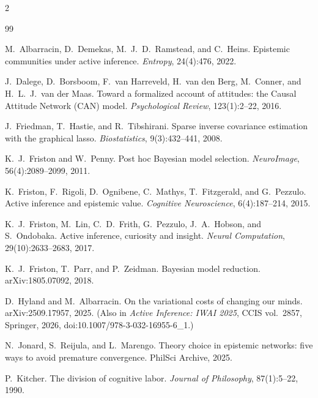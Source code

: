 \documentclass[11pt]{article}
\begin{document}
\setlength{\bibsep}{1.2pt}
\begin{multicols}{2}\raggedright
\begin{thebibliography}{99}\footnotesize

M.~Albarracin, D.~Demekas, M.~J.~D.~Ramstead, and C.~Heins.
Epistemic communities under active inference. \emph{Entropy}, 24(4):476, 2022.

J.~Dalege, D.~Borsboom, F.~van Harreveld, H.~van den Berg, M.~Conner, and H.~L.~J.~van der Maas.
Toward a formalized account of attitudes: the Causal Attitude Network (CAN) model.
\emph{Psychological Review}, 123(1):2--22, 2016.

J.~Friedman, T.~Hastie, and R.~Tibshirani.
Sparse inverse covariance estimation with the graphical lasso.
\emph{Biostatistics}, 9(3):432--441, 2008.

K.~J.~Friston and W.~Penny.
Post hoc Bayesian model selection. \emph{NeuroImage}, 56(4):2089--2099, 2011.

K.~Friston, F.~Rigoli, D.~Ognibene, C.~Mathys, T.~Fitzgerald, and G.~Pezzulo.
Active inference and epistemic value. \emph{Cognitive Neuroscience}, 6(4):187--214, 2015.

K.~J.~Friston, M.~Lin, C.~D.~Frith, G.~Pezzulo, J.~A.~Hobson, and S.~Ondobaka.
Active inference, curiosity and insight. \emph{Neural Computation}, 29(10):2633--2683, 2017.

K.~J.~Friston, T.~Parr, and P.~Zeidman.
Bayesian model reduction. arXiv:1805.07092, 2018.

D.~Hyland and M.~Albarracin.
On the variational costs of changing our minds. arXiv:2509.17957, 2025.
(Also in \emph{Active Inference: IWAI 2025}, CCIS vol.~2857, Springer, 2026,
doi:10.1007/978-3-032-16955-6\_1.)

N.~Jonard, S.~Reijula, and L.~Marengo.
Theory choice in epistemic networks: five ways to avoid premature convergence. PhilSci Archive, 2025.

P.~Kitcher.
The division of cognitive labor. \emph{Journal of Philosophy}, 87(1):5--22, 1990.


\end{thebibliography}
\end{multicols}
\end{document}

